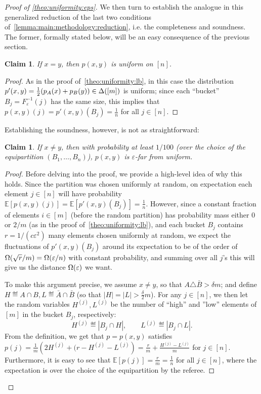 \documentclass[11pt]{article}
\newtheorem{claim}[clm]{Claim}
\theoremstyle{remark}   	\newtheorem{remark}[theorem]{Remark}
\theoremstyle{definition}   	\newaliascnt{defn}{theorem}
\newenvironment{proofof}[1]{\begin{proof}[Proof of {#1}]}{\end{proof}}
\newcommand{\eps}{\ensuremath{\varepsilon}\xspace}
\newcommand{\bigOmega}[1]{{\Omega\mleft( #1 \mright)}}
\newcommand{\expect}[1]{\mathbb{E}\!\left[#1\right]}
\newcommand{\abs}[1]{\left\lvert #1 \right\rvert}
\begin{document}
\begin{proofof}{\autoref{theo:uniformity:eps}}
We then turn to establish the analogue in this generalized reduction of the last two conditions of~\autoref{lemma:main:methodology:reduction}, i.e. the completeness and soundness. The former, formally stated below, will be an easy consequence of the previous section.
\begin{claim}\label{claim:eps:uniformity:completeness}
If $x=y$, then $p(x,y)$ is uniform on $[n]$.
\end{claim}
\begin{proof}
As in the proof of~\autoref{theo:uniformity:lb}, in this case the distribution $p'(x,y) = \frac{1}{2}(p_A(x)+p_B(y))\in\Delta\!\left([m]\right)$ is uniform; since each ``bucket'' $B_j=F_\eps^{-1}(j)$ has the same size, this implies that $p(x,y)(j) = p'(x,y)( B_j ) = \frac{1}{n}$ for all $j\in[n]$.
\end{proof}

\noindent Establishing the soundness, however, is not as straightforward:
\begin{claim}\label{claim:eps:uniformity:soundness}
If $x\neq y$, then with probability at least $1/100$ (over the choice of the equipartition $(B_1,\dots, B_n)$), $p(x,y)$ is \eps-far from uniform.
\end{claim}
\begin{proof}
Before delving into the proof, we provide a high-level idea of why this holds. Since the partition was chosen uniformly at random, on expectation each element $j\in[n]$ will have probability $\expect{p(x,y)(j)} = \expect{p'(x,y)( B_j )} = \frac{1}{n}$. However, since a constant fraction of elements $i\in[m]$ (before the random partition) has probability mass either $0$ or $2/m$ (as in the proof of~\autoref{theo:uniformity:lb}), and each bucket $B_j$ contains $r=1/(c\eps^2)$ many elements chosen uniformly at random, we expect the fluctuations of $p'(x,y)( B_j )$ around its expectation to be of the order of $\bigOmega{\sqrt{r}/m} = \bigOmega{\eps/n}$ with constant probability, and summing over all $j$'s this will give us the distance $\bigOmega{\eps}$ we want.

To make this argument precise, we assume $x\neq y$, so that $A\triangle \bar{B} > \delta m$; and define $H\eqdef A\cap B,L\eqdef\bar{A}\cap \bar{B}$ (so that $\abs{H}=\abs{L} > \frac{\delta}{2}m$). For any $j\in[n]$, we then let the random variables $H^{(j)}, L^{(j)}$ be the number of ``high'' and ''low'' elements of $[m]$ in the bucket $B_j$, respectively:
\[
H^{(j)} \eqdef \abs{B_j\cap H}, \qquad L^{(j)} \eqdef \abs{B_j\cap L}.
\]
From the definition, we get that $p=p(x,y)$ satisfies $p(j) = \frac{1}{m}\left(2H^{(j)} + (r - H^{(j)} - L^{(j)}\right) = \frac{r}{m} + \frac{H^{(j)} - L^{(j)}}{m}$ for $j\in[n]$. Furthermore, it is easy to see that $\expect{p(j)} = \frac{r}{m} = \frac{1}{n}$ for all $j\in[n]$, where the expectation is over the choice of the equipartition by the referee.


\end{proof}
\end{proofof}
\end{document}
